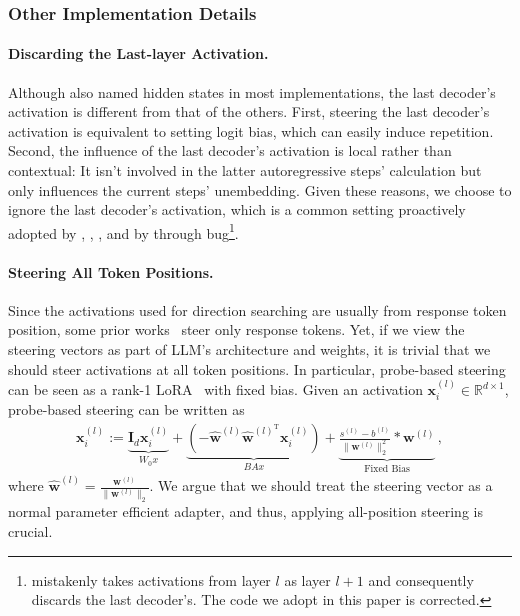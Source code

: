 \documentclass{article}
\theoremstyle{plain}
\theoremstyle{definition}
\theoremstyle{remark}
\begin{document}
\subsubsection{Other Implementation Details}\label{sec:otherImplement}

\paragraph{Discarding the Last-layer Activation.} Although also named hidden states in most implementations, the last decoder's activation is different from that of the others. First, steering the last decoder's activation is equivalent to setting logit bias, which can easily induce repetition. Second, the influence of the last decoder's activation is local rather than contextual: It isn't involved in the latter autoregressive steps' calculation but only influences the current steps' unembedding. Given these reasons, we choose to ignore the last decoder's activation, which is a common setting proactively adopted by \citet{rep}, \citet{angle}, \citet{singleDirection}, and by \citet{scav} through bug\footnote{\citet{scav} mistakenly takes activations from layer $l$ as layer $l + 1$ and consequently discards the last decoder's. The code we adopt in this paper is corrected.}.

\paragraph{Steering All Token Positions.} Since the activations used for direction searching are usually from response token position, some prior works~\cite{scav, persona} steer only response tokens. Yet, if we view the steering vectors as part of LLM's architecture and weights, it is trivial that we should steer activations at all token positions. In particular, probe-based steering can be seen as a rank-1 LoRA~\cite{lora} with fixed bias. Given an activation $\mathbf{x}_{i}^{(l)} \in \mathbb{R}^{d \times 1}$, probe-based steering can be written as
\begin{align}
	\mathbf{x}_{i}^{(l)} := \underbrace{\mathbf{I}_{d}\mathbf{x}_{i}^{(l)}}_{W_{0}x} + \underbrace{(- \hat{\mathbf{w}}^{(l)}\hat{\mathbf{w}}^{(l)^{\text{T}}}\mathbf{x}_{i}^{(l)})}_{BAx} + \underbrace{\frac{s^{(l)} - b^{(l)}}{\|\mathbf{w}^{(l)}\|_{2}^{2}}* \mathbf{w}^{(l)}}_{\text{Fixed Bias}}\,,
\end{align}
where $\hat{\mathbf{w}}^{(l)} = \frac{\mathbf{w}^{(l)}}{\|\mathbf{w}^{(l)}\|_{2}}$. We argue that we should treat the steering vector as a normal parameter efficient adapter, and thus, applying all-position steering is crucial.
\end{document}
